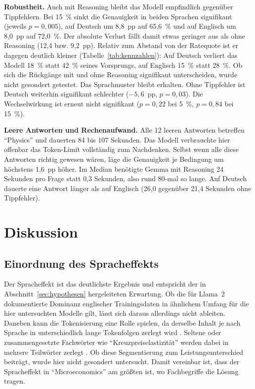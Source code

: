 \documentclass[a4paper,titlepage]{article}
\numberwithin{equation}{section} %
\begin{document}
\textbf{Robustheit.} Auch mit Reasoning bleibt das Modell empfindlich gegenüber Tippfehlern. Bei 15~\% sinkt die Genauigkeit in beiden Sprachen signifikant (jeweils $p = 0{,}005$), auf Deutsch um 8,8~pp auf 65,6~\% und auf Englisch um 8,0~pp auf 72,0~\%. Der absolute Verlust fällt damit etwas geringer aus als ohne Reasoning (12,4 bzw. 9,2~pp). Relativ zum Abstand von der Ratequote ist er dagegen deutlich kleiner (Tabelle~\ref{tab:kennzahlen}): Auf Deutsch verliert das Modell 18~\% statt 42~\% seines Vorsprungs, auf Englisch 15~\% statt 28~\%. Ob sich die Rückgänge mit und ohne Reasoning signifikant unterscheiden, wurde nicht gesondert getestet. Das Sprachmuster bleibt erhalten. Ohne Tippfehler ist Deutsch weiterhin signifikant schlechter ($-5{,}6$~pp, $p = 0{,}03$). Die Wechselwirkung ist erneut nicht signifikant ($p = 0{,}22$ bei 5~\%, $p = 0{,}84$ bei 15~\%).

\textbf{Leere Antworten und Rechenaufwand.} Alle 12 leeren Antworten betreffen "`Physics"' und dauerten 84 bis 107 Sekunden. Das Modell verbrauchte hier offenbar das Token-Limit vollständig zum Nachdenken. Selbst wenn alle diese Antworten richtig gewesen wären, läge die Genauigkeit je Bedingung um höchstens 1,6~pp höher. Im Median benötigte Gemma mit Reasoning 24 Sekunden pro Frage statt 0,3 Sekunden, also rund 80-mal so lange. Auf Deutsch dauerte eine Antwort länger als auf Englisch (26,0 gegenüber 21,4 Sekunden ohne Tippfehler).

\newpage

\section{Diskussion}\label{sec:diskussion}


\subsection{Einordnung des Spracheffekts}\label{sec:einordnung-sprache}

Der Spracheffekt ist das deutlichste Ergebnis und entspricht der in Abschnitt~\ref{sec:hypothesen} hergeleiteten Erwartung. Ob die für Llama~2 dokumentierte Dominanz englischer Trainingsdaten \citep{touvron_llama_2023} in ähnlichem Umfang für die hier untersuchten Modelle gilt, lässt sich daraus allerdings nicht ableiten. Daneben kann die Tokenisierung eine Rolle spielen, da derselbe Inhalt je nach Sprache in unterschiedlich lange Tokenfolgen zerlegt wird \citep{petrov_language_2023}. Seltene oder zusammengesetzte Fachwörter wie "`Kreuzpreiselastizität"' werden dabei in mehrere Teilwörter zerlegt \citep{sennrich_neural_2016}. Ob diese Segmentierung zum Leistungsunterschied beiträgt, wurde hier nicht gesondert untersucht. Damit vereinbar ist, dass der Spracheffekt in "`Microeconomics"' am größten ist, wo Fachbegriffe die Lösung tragen.
\end{document}

